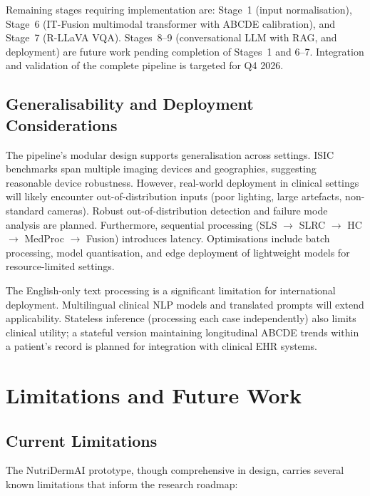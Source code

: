 \documentclass[conference]{IEEEtran}
\begin{document}
Remaining stages requiring implementation are: Stage~1 (input
normalisation), Stage~6 (IT-Fusion multimodal transformer with ABCDE
calibration), and Stage~7 (R-LLaVA VQA). Stages~8--9 (conversational LLM
with RAG, and deployment) are future work pending completion of Stages~1
and 6--7. Integration and validation of the complete pipeline is
targeted for Q4 2026.

\subsection{Generalisability and Deployment Considerations}

The pipeline's modular design supports generalisation across settings.
ISIC benchmarks span multiple imaging devices and geographies, suggesting
reasonable device robustness. However, real-world deployment in clinical
settings will likely encounter out-of-distribution inputs (poor lighting,
large artefacts, non-standard cameras). Robust out-of-distribution
detection and failure mode analysis are planned. Furthermore, sequential
processing (SLS $\to$ SLRC $\to$ HC $\to$ MedProc $\to$ Fusion)
introduces latency. Optimisations include batch processing, model
quantisation, and edge deployment of lightweight models for resource-limited
settings.

The English-only text processing is a significant limitation for
international deployment. Multilingual clinical NLP models and translated
prompts will extend applicability. Stateless inference (processing each
case independently) also limits clinical utility; a stateful version
maintaining longitudinal ABCDE trends within a patient's record is
planned for integration with clinical EHR systems.

\section{Limitations and Future Work}

\subsection{Current Limitations}

The NutriDermAI prototype, though comprehensive in design, carries several
known limitations that inform the research roadmap:
\end{document}
